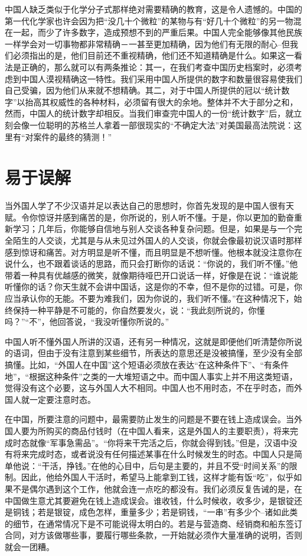 \documentclass[12pt,oneside]{book}
\begin{document}
\begin{common-format}
中国人缺乏类似于化学分子式那样绝对需要精确的教育，这是令人遗憾的。中国的第一代化学家也许会因为把“没几十个微粒”的某物与有“好几十个微粒”的另一物混在一起，而少了许多数字，造成预想不到的严重后果。中国人完全能够像其他民族一样学会对一切事物都非常精确－一甚至更加精确，因为他们有无限的耐心--但我们必须指出的是，他们目前还不重视精确，他们还不知道精确是什么。如果这一看法是正确的，那么就可以有两条推论：其一，在我们考查中国历史档案时，必须考虑到中国人漠视精确这一特性。我们采用中国人所提供的数字和数量很容易使我们自己受骗，因为他们从来就不想精确。其二，对于中国人所提供的冠以“统计数字”以抬高其权威性的各种材料，必须留有很大的余地。整体并不大于部分之和，然而，中国人的统计数字却相反。当我们审查完中国人的一份“统计数字”后，就立刻会像一位聪明的苏格兰人拿着一部很现实的“不确定大法”对美国最高法院说：这里有“对案件的最终的猜测！”


\chapter{易于误解}
当外国人学了不少汉语并足以表达自己的思想时，你首先发现的是中国人很有天赋。令你惊讶并感到痛苦的是，你所说的，别人听不懂。于是，你以更加的勤奋重新学习；几年后，你能够自信地与别人交谈各种复杂问题。但是，如果是与一个完全陌生的人交谈，尤其是与从未见过外国人的人交谈，你就会像最初说汉语时那样感到惊讶和痛苦。对方明显是听不懂，而且明显是不想听懂。他根本就没注意你在说什么，也不跟着谈话的思路，而只会打断你的话说：“你说的，我们听不懂。”他带着一种具有优越感的微笑，就像期待哑巴开口说话一样，好像是在说：“谁说能听懂你的话？你天生就不会讲中国话，这是你的不幸，但不是你的过错。可是，你应当承认你的无能。不要为难我们，因为你说的，我们听不懂。”在这种情况下，始终保持一种平静是不可能的，你自然要发火，说：“我此刻所说的，你懂吗？”“不”，他回答说，“我没听懂你所说的。” 

中国人听不懂外国人所讲的汉语，还有另一种情况，这就是即便他们听清楚你所说的语词，但由于没有注意到某些细节，所表达的意思还是没被搞懂，至少没有全部搞懂。比如，“外国人在中国”这个短语必须放在表达“在这种条件下”、“有条件地”，“根据这种条件”之类的一大堆短语之中。而中国人事实上并不用这类短语，觉得没有这个必要，这与外国人大不相同。中国人也不用时态，不在乎时态，而外国人就一定要注意时态。 

在中国，所要注意的问题中，最需要防止发生的问题是不要在钱上造成误会。当外国人要为所购买的商品付钱时（在中国人看来，这是外国人的主要职责），将来完成时态就像“军事急需品”。“你将来干完活之后，你就会得到钱。”但是，汉语中没有将来完成时态，或者说没有任何描述某事在什么时候发生的时态。中国人只是简单他说：“干活，挣钱。”在他的心目中，后句是主要的，并且不受“时间关系”的限制。因此，他给外国人干活时，希望马上能拿到工钱，这样才能有饭“吃”，似乎如果不是偶尔遇到这个工作，他就会连一点吃的都没有。我们必须反复告诫的是，在中国做生意尤其要避免在钱上造成误会。谁收钱，什么时候收，收多少，是银锭还是铜钱；若是银锭，成色怎样，重量多少；若是铜钱，“一串”有多少个--诸如此类的细节，在通常情况下是不可能说得太明白的。若是与营造商、经销商和船东签订合同，对方该做哪些事，要履行哪些条款，一开始就必须作大量准确的说明，否则就会一团糟。 


\end{common-format}
\end{document}
